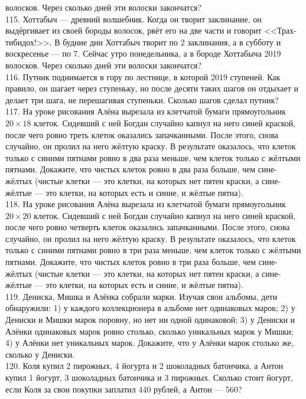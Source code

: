 волосков. Через сколько дней эти волоски закончатся?\\
115. Хоттабыч --- древний волшебник. Когда он творит заклинание, он выдёргивает из своей бороды волосок, рвёт его на две части и говорит <<Трах-тибидох!>>. В будние дни Хоттабыч творит по 2 заклинания, а в субботу и воскресенье --- по 7. Сейчас утро понедельника, а в бороде Хоттабыча 2019
волосков. Через сколько дней эти волоски закончатся?\\
116. Путник поднимается в гору по лестнице, в которой 2019 ступеней. Как правило, он шагает через ступеньку, но после десяти таких шагов он отдыхает и делает три шага, не перешагивая ступеньки. Сколько шагов сделал путник?\\
117. На уроке рисования Алёна вырезала из клетчатой бумаги прямоугольник $20\times18$ клеток. Сидевший с ней Богдан случайно капнул на него синей краской, после чего ровно треть клеток оказались запачканными. После этого, снова случайно, он пролил на него жёлтую краску. В результате оказалось, что клеток только с синими пятнами ровно в два раза меньше, чем клеток только с жёлтыми пятнами. Докажите, что чистых клеток ровно в два раза больше, чем сине-жёлтых (чистые клетки --- это клетки, на которых нет пятен краски, а сине-жёлтые --- это клетки, на которых есть и синие, и жёлтые пятна).\\
118.  На уроке рисования Алёна вырезала из клетчатой бумаги прямоугольник $20\times20$ клеток. Сидевший с ней Богдан случайно капнул на него синей краской, после чего ровно четверть клеток оказались запачканными. После этого, снова случайно, он пролил на него жёлтую краску. В результате оказалось, что клеток только с синими пятнами ровно в три раза меньше, чем клеток только с жёлтыми пятнами. Докажите, что чистых клеток ровно в три раза больше, чем сине-жёлтых (чистые клетки --- это клетки, на которых нет пятен краски, а сине-жёлтые --- это клетки, на которых есть и синие, и жёлтые пятна).\\
119. Дениска, Мишка и Алёнка собрали марки. Изучая свои альбомы, дети обнаружили: 1) у каждого коллекционера в альбоме нет одинаковых марок; 2) у Дениски и Мишки марок поровну, но нет ни одной одинаковой; 3) у Дениски и Алёнки одинаковых марок ровно столько, сколько уникальных марок у Мишки; 4) у Алёнки нет уникальных марок. Докажите, что у Алёнки марок столько же, сколько у Дениски.\\
120. Коля купил 2 пирожных, 4 йогурта и 2 шоколадных батончика, а Антон купил 1 йогурт, 3 шоколадных батончика и 3 пирожных. Сколько стоит йогурт, если Коля за свои покупки заплатил 440 рублей, а Антон --- 560?\\

